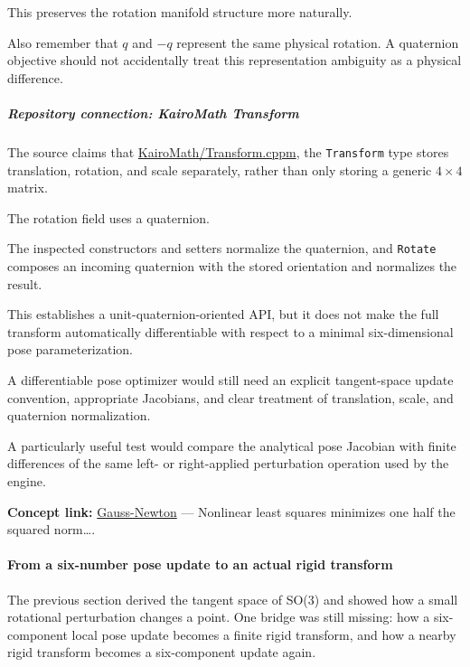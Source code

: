 This preserves the rotation manifold structure more naturally.

Also remember that \(q\) and \(-q\) represent the same physical rotation. A quaternion objective should not accidentally treat this representation ambiguity as a physical difference.

\subparagraph{Repository connection: KairoMath Transform}\label{repository-connection-kairomath-transform}

The source claims that \href{https://github.com/swayam8624/KairoMath/blob/master/Transform.cppm?utm_source=chatgpt.com}{KairoMath/Transform.cppm}, the \texttt{Transform} type stores translation, rotation, and scale separately, rather than only storing a generic \(4\times4\) matrix.

The rotation field uses a quaternion.

The inspected constructors and setters normalize the quaternion, and \texttt{Rotate} composes an incoming quaternion with the stored orientation and normalizes the result.

This establishes a unit-quaternion-oriented API, but it does not make the full transform automatically differentiable with respect to a minimal six-dimensional pose parameterization.

A differentiable pose optimizer would still need an explicit tangent-space update convention, appropriate Jacobians, and clear treatment of translation, scale, and quaternion normalization.

A particularly useful test would compare the analytical pose Jacobian with finite differences of the same left- or right-applied perturbation operation used by the engine.

\textbf{Concept link:} \hyperref[02-foundations-ii-ch026]{Gauss-Newton} --- Nonlinear least squares minimizes one half the squared norm\ldots.

\paragraph{From a six-number pose update to an actual rigid transform}\label{from-a-six-number-pose-update-to-an-actual-rigid-transform}

The previous section derived the tangent space of SO(3) and showed how a small rotational perturbation changes a point. One bridge was still missing: how a six-component local pose update becomes a finite rigid transform, and how a nearby rigid transform becomes a six-component update again.

